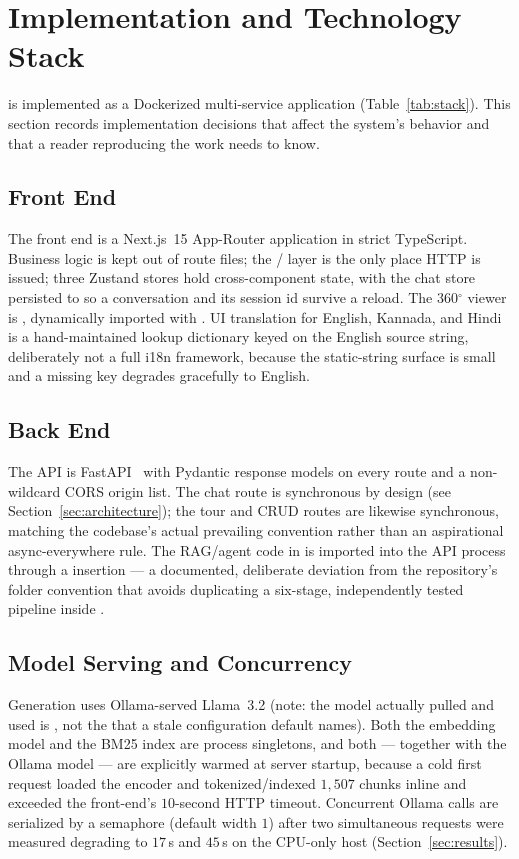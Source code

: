 \section{Implementation and Technology Stack}
\label{sec:impl}


\system{} is implemented as a Dockerized multi-service application
(Table~\ref{tab:stack}). This section records implementation decisions that
affect the system's behavior and that a reader reproducing the work needs
to know.

\subsection{Front End}
The front end is a Next.js~15 App-Router application in strict TypeScript.
Business logic is kept out of route files; the / layer
is the only place HTTP is issued; three Zustand stores hold cross-component
state, with the chat store persisted to  so a
conversation and its session id survive a reload. The 360$^{\circ}$ viewer
is , dynamically imported with . UI
translation for English, Kannada, and Hindi is a hand-maintained lookup
dictionary keyed on the English source string, deliberately not a
full i18n framework, because the static-string surface is small and a
missing key degrades gracefully to English.

\subsection{Back End}
The API is FastAPI~\cite{ramirez2018fastapi} with Pydantic response models
on every route and a non-wildcard CORS origin list. The chat route is synchronous by design (see
Section~\ref{sec:architecture}); the tour and CRUD routes are likewise
synchronous, matching the codebase's actual prevailing convention rather
than an aspirational async-everywhere rule. The RAG/agent code in
 is imported into the API process through a
 insertion --- a documented, deliberate deviation from the
repository's folder convention that avoids duplicating a six-stage,
independently tested pipeline inside .

\subsection{Model Serving and Concurrency}
Generation uses Ollama-served Llama~3.2 (note: the model actually pulled
and used is , not the  that a stale
configuration default names). Both the embedding model and the BM25 index
are process singletons, and both --- together with the Ollama model --- are
explicitly warmed at server startup, because a cold first request loaded
the encoder and tokenized/indexed $1{,}507$ chunks inline and exceeded the
front-end's $10$-second HTTP timeout. Concurrent Ollama calls are
serialized by a semaphore (default width $1$) after two simultaneous
requests were measured degrading to $17$\,s and $45$\,s on the CPU-only
host (Section~\ref{sec:results}).

